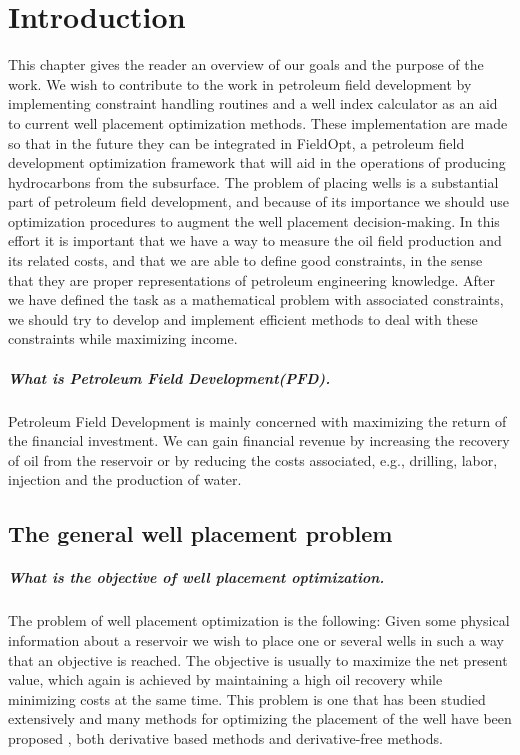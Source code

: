 
\chapter{Introduction}
%
This chapter gives the reader an overview of
our goals and the purpose of the work.
We wish to contribute to the work in petroleum field development 
by implementing constraint handling routines and a 
well index calculator as an aid to current well placement 
optimization methods. These implementation are made so that 
in the future they can be integrated in FieldOpt\cite{Fieldopt},
a petroleum field development optimization framework that will 
aid in the operations of producing hydrocarbons from the subsurface.
% 
The problem of placing wells is a substantial 
part of petroleum field development, and because of its 
importance we should use optimization procedures to augment 
the well placement decision-making. In this effort it is 
important that we have a way to measure the 
oil field production and its related costs, and that
we are able to define good constraints, in the sense 
that they are proper representations of petroleum engineering 
knowledge. After we have defined the task as a 
mathematical problem with associated constraints, we should 
try to develop and implement efficient methods to deal with
these constraints while maximizing income.
%
\paragraph{What is Petroleum Field Development(PFD).}
%
Petroleum Field Development is mainly concerned with maximizing 
the return of the financial
investment. We can gain financial revenue by increasing 
the recovery of oil from the reservoir or by reducing the
costs associated, e.g., drilling, labor, injection 
and the production of water.
%
%
\section{The general well placement problem}
%
\paragraph{What is the objective of well placement optimization.}
%
The problem of well placement optimization is the following:
Given some physical information about a reservoir we wish to place 
one or several wells in such a way that an objective is reached.
The objective is usually to maximize the net present value, which 
again is achieved by maintaining a high oil recovery while minimizing
costs at the same time.
%
This problem is one that has been studied extensively and many 
methods for optimizing the placement of the well have been proposed \cite{Bellout_paper}, 
both derivative based methods and derivative-free methods. 
%
%
